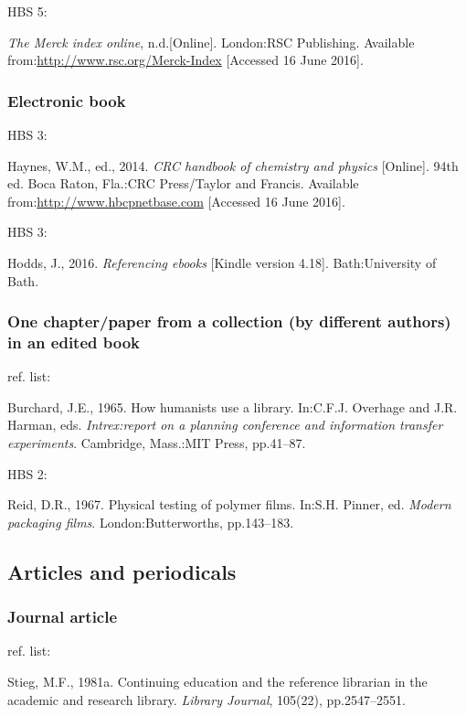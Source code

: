 HBS 5: \cite{merckNDidx}

\emph{The Merck index online}, n.d.\@ [Online]. London:\@ RSC Publishing. Available from:\@ \url{http://www.rsc.org/Merck-Index} [Accessed 16 June 2016].



\subsubsection*{Electronic book}

HBS 3: \cite{haynes2014crc}

Haynes, W.M., ed.\@, 2014. \emph{CRC handbook of chemistry and physics} [Online]. 94th ed. Boca Raton, Fla.:\@ CRC Press/Taylor and Francis. Available from:\@ \url{http://www.hbcpnetbase.com} [Accessed 16 June 2016].


HBS 3: \cite{hodds2016re}

Hodds, J., 2016. \emph{Referencing ebooks} [Kindle version 4.18]. Bath:\@ University of Bath.



\subsubsection*{One chapter\slash paper from a collection (by different authors) in an edited book}

ref. list: \cite{burchard1965hhl}

Burchard, J.E., 1965. How humanists use a library. In:\@ C.F.J. Overhage and J.R. Harman, eds. \emph{Intrex:\@ report on a planning conference and information transfer experiments}. Cambridge, Mass.:\@ MIT Press, pp.41--87.


HBS 2: \cite{reid1967ptp}

Reid, D.R., 1967. Physical testing of polymer films. In:\@ S.H. Pinner, ed. \emph{Modern packaging films}. London:\@ Butterworths, pp.143--183.



\subsection{Articles and periodicals}

\subsubsection*{Journal article}

ref. list: \cite{stieg1981cer}

Stieg, M.F., 1981a. Continuing education and the reference librarian in the academic and research library. \emph{Library Journal}, 105(22), pp.2547--2551.

